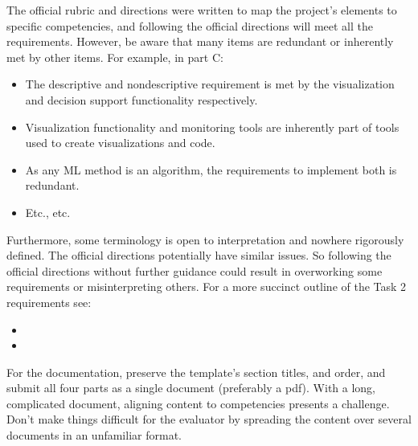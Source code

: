 \documentclass[letterpaper,10pt,english]{jupyterBook}
\begin{document}
\sphinxAtStartPar
The official rubric and directions were written to map the project’s elements to specific competencies, and following the official directions will meet all the requirements. However, be aware that many items are redundant or inherently met by other items. For example, in part C:
\begin{itemize}
\item {} 
\sphinxAtStartPar
The descriptive and nondescriptive requirement is met by the visualization and decision support functionality respectively.

\item {} 
\sphinxAtStartPar
Visualization functionality and monitoring tools are inherently part of tools used to create visualizations and code.

\item {} 
\sphinxAtStartPar
As any ML method is an algorithm, the requirements to implement both is redundant.

\item {} 
\sphinxAtStartPar
Etc., etc.

\end{itemize}

\sphinxAtStartPar
Furthermore, some terminology is open to interpretation and nowhere rigorously defined. The official directions potentially have similar issues. So following the official directions without further guidance could result in overworking some requirements or misinterpreting others. For a more succinct outline of the Task 2 requirements see:
\begin{itemize}
\item {} 
\sphinxAtStartPar
{}

\item {} 
\sphinxAtStartPar
{}

\end{itemize}

\sphinxAtStartPar
For the documentation, preserve the template’s section titles, and order, and submit all four parts as a single document (preferably a pdf). With a long, complicated document, aligning content to competencies presents a challenge. Don’t make things difficult for the evaluator by spreading the content over several documents in an unfamiliar format.
\end{document}
